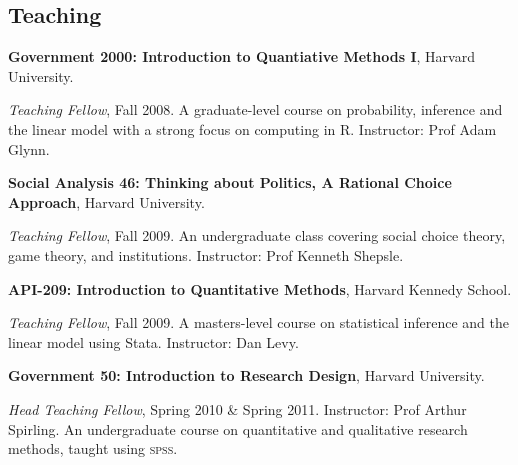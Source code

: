 \documentclass[margin,line]{res}
\newenvironment{list1}{
  \begin{list}{\ding{113}}{%
      \setlength{\itemsep}{0in}
      \setlength{\parsep}{0in} \setlength{\parskip}{0in}
      \setlength{\topsep}{0in} \setlength{\partopsep}{0in} 
      \setlength{\leftmargin}{0.83 cm}}}{\end{list}}
\begin{document}
\begin{resume}
\section{\textsf{\sc Teaching}}
{\bf Government 2000: Introduction to Quantiative Methods I}, Harvard
University.
\begin{list1} 
\item[] {\em Teaching Fellow}, Fall 2008. A graduate-level course on
probability, inference and the linear model with a strong focus on computing in
R. Instructor: Prof Adam Glynn.
\end{list1}
{\bf Social Analysis 46: Thinking about Politics, A Rational Choice Approach}, Harvard
University.
\begin{list1} 
\item[] {\em Teaching Fellow}, Fall 2009. An undergraduate class
  covering social choice theory, game theory, and
  institutions. Instructor: Prof Kenneth Shepsle.
\end{list1}
{\bf API-209: Introduction to Quantitative Methods}, Harvard
Kennedy School.
\begin{list1} 
\item[] {\em Teaching Fellow}, Fall 2009. A masters-level course on
  statistical inference and the linear model using
  Stata. Instructor: Dan Levy. 
\end{list1}
{\bf Government 50: Introduction to Research Design}, Harvard University.
\begin{list1} 
\item[] {\em Head Teaching Fellow}, Spring 2010 \& Spring 2011. Instructor: Prof
  Arthur Spirling. An undergraduate course on quantitative and
  qualitative research methods, taught using \textsc{spss}.
\end{list1}


\end{resume}
\end{document}

